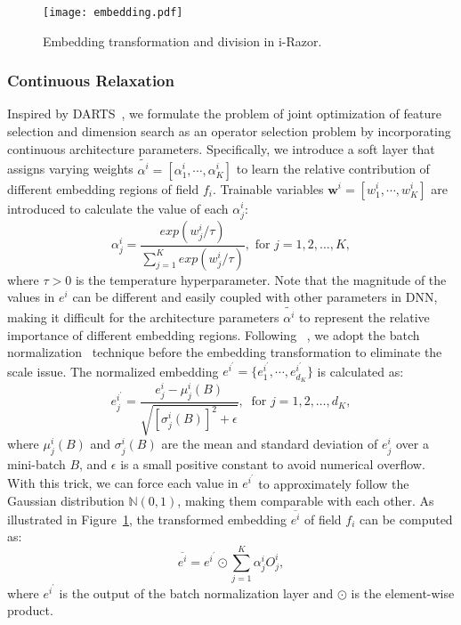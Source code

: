 \documentclass[10pt,journal,compsoc]{IEEEtran}
\begin{document}
\begin{figure}[thbp!]
  \centering
  \texttt{[image: embedding.pdf]}
  \caption{Embedding transformation and division in i-Razor.}
  \label{fig:embedding}
\end{figure}

\subsubsection{Continuous Relaxation}
Inspired by DARTS~\cite{liang2019darts+, liu2018darts}, we formulate the problem of joint optimization of feature selection and dimension search as an operator selection problem by incorporating continuous architecture parameters. 
Specifically, we introduce a soft layer that assigns varying weights $\widetilde{\alpha^i}=\left[\alpha_1^i,\cdots,\alpha_{K}^i\right]$
to learn the relative contribution of different embedding regions of field $f_i$. 
Trainable variables $\mathbf{w}^i=\left[w_1^i,\cdots,w_{K}^i\right]$ are introduced to calculate the value of each $\alpha^i_j$:
\begin{equation}
  \label{alph_weight}
  \alpha_j^i = \frac{exp(w_j^i/\tau)}{\sum_{j=1}^K exp(w_j^i / \tau)}, \text{ for }  j = 1,2,\ldots, K,
\end{equation} 
where $\tau>0$ is the temperature hyperparameter.
Note that the magnitude of the values in $e^i$ can be different and easily coupled with other parameters in DNN, making it difficult for the architecture parameters $\widetilde{\alpha^i}$ to represent the relative importance of different embedding regions. Following ~\cite{liu2020autofis,pin_2019}, we adopt the batch normalization~\cite{ioffe2015batch} technique before the embedding transformation to eliminate the scale issue. 
The normalized embedding $e^{i^{\prime}} = \{ e^{i^{\prime}}_1, \cdots , e^{i^{\prime}}_{d_K}\}$ is calculated as: 
\begin{equation}
  e^{i^{\prime}}_j = \frac{e^i_j - \mu^i_j(B)}{\sqrt{{[\sigma^i_j(B)]}^2+\epsilon}}, \  \text{ for }  j = 1,2,\ldots, d_K, %
\end{equation}
where $\mu^i_j(B)$ and $\sigma^i_j(B)$ are the mean and standard deviation of $e_j^i$ over a mini-batch ${B}$, and $\epsilon$ is a small positive constant to avoid numerical overflow. 
{With this trick, we can force each value in $e^{i^{\prime}}$ }to approximately follow the Gaussian distribution $\mathbb{N}(0, 1)$, making them comparable with each other.
As illustrated in Figure~\ref{fig:embedding}, the transformed embedding $\overline{e^i}$ of field $f_i$ can be computed as:
\begin{equation}
\label{equ_emb}
   \overline{e^i} = e^{i^{\prime}} \odot \sum_{j=1}^K{\alpha_{j}^i O^i_j},
\end{equation}
where $e^{i^{\prime}}$ is the output of the batch normalization layer and $\odot$ is the element-wise product. 
\end{document}
